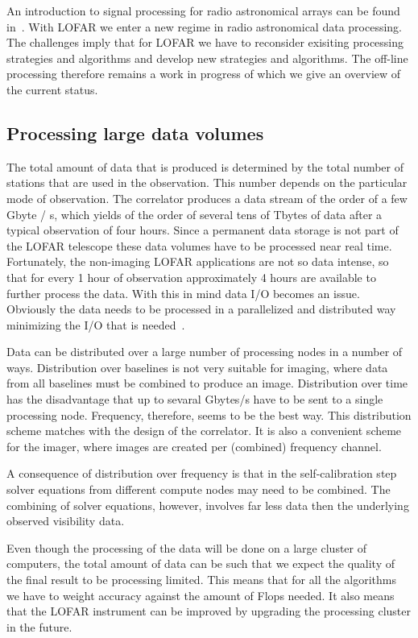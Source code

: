 \documentclass[journal]{IEEEtran}
\begin{document}
An introduction to signal processing for radio astronomical arrays can be found in~\cite{Veen1:04,Veen2:04,Boonstra:05}. With LOFAR we enter a new regime in radio astronomical data processing.  The challenges imply that for LOFAR we have to reconsider exisiting processing strategies and algorithms and develop new strategies and algorithms. The off-line processing therefore remains a work in progress of which we give an overview of the current status.
\label{sec:offline}

\subsection{Processing large data volumes}

The total amount of data that is produced is determined by the total number of stations that are used in the observation. This number depends on the particular mode of observation. The correlator produces a data stream of the order of a few Gbyte / s, which yields of the order of several tens of Tbytes of data after a typical observation of four hours. Since a permanent data storage is not part of the LOFAR telescope these data volumes have to be processed near real time. Fortunately, the non-imaging LOFAR applications are not so data intense, so that for every 1 hour of observation approximately 4 hours are available to further process the data. With this in mind data I/O becomes an issue. Obviously the data needs to be processed in a parallelized and distributed way minimizing the I/O that is needed~\cite{Loose:08,Diepen:08}.  
 
Data can be distributed over a large number of processing nodes in a number of ways. Distribution over baselines is not very suitable for imaging, where data from all baselines must be combined to produce an image. Distribution over time has the disadvantage that up to sevaral Gbytes/s have to be sent to a single processing node. Frequency, therefore, seems to be the best way. This distribution scheme matches with the design of the correlator. It is also a convenient scheme for the imager, where images are created per (combined) frequency channel. 

A consequence of distribution over frequency is that in the self-calibration step solver equations from different compute nodes may need to be combined. The combining of solver equations, however, involves far less data then the underlying observed visibility data.   

Even though the processing of the data will be done on a large cluster of computers, the total amount of data can be such that we expect the quality of the final result to be processing limited. This means that for all the algorithms we have to weight accuracy against the amount of Flops needed. It also means that the LOFAR instrument can be improved by upgrading the processing cluster in the future. 
\end{document}
